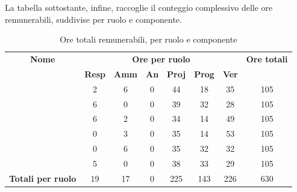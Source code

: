 La tabella sottostante, infine, raccoglie il conteggio complessivo delle ore remunerabili, suddivise per ruolo e componente.

\begin{table}[H]
	\begin{center}
		\begin{tabular}{|c|c|c|c|c|c|c|c|}
			\hline
			\textbf{Nome} & \multicolumn{6}{c|}{\textbf{Ore per ruolo}} & \textbf{Ore totali} \\\cline{2-7}
			& \textbf{Resp} & \textbf{Amm} & \textbf{An} & \textbf{Proj} & \textbf{Prog} & \textbf{Ver} & \\
			\hline
			\MC			&	2	&	6	&	0	&	44	&	18	&	35	&	105	\\
			\hline
			\AN			&	6	&	0	&	0	&	39	&	32	&	28	& 	105	\\
			\hline
			\DAN		&	6	&	2	&	0	&	34	&	14	&	49	&	105	\\
			\hline
			\AS			&	0	&	3 	&	0 	&	35	&	14 	& 	53	&	105	\\
			\hline
			\NS 		&	0	&	6	&	0	&	35	&	32	& 	32	&	105	\\
			\hline
			\DS			& 	5	&	0	&	0	&	38	&	33	&	29	&	105	\\
			\hline
			\textbf{Totali per ruolo}	& 	19	&	17	&	0	&  225	&	143	&	226	&	630	\\
			\hline
		\end{tabular}
	\end{center}
	\caption{Ore totali remunerabili, per ruolo e componente}
\end{table}

